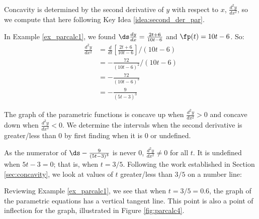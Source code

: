 {Concavity is determined by the second derivative of $y$ with respect to $x$, $\frac{d^2y}{dx^2}$, so we compute that here following Key Idea \ref{idea:second_der_par}.

In Example \ref{ex_parcalc1}, we found $\ds\frac{dy}{dx} = \frac{2t+6}{10t-6}$ and $\fp(t) = 10t-6$. So:
\begin{align*}
\frac{d^2y}{dx^2} &= \frac{d}{dt}\left[\frac{2t+6}{10t-6}\right]\Bigg/(10t-6) \\
				&= -\frac{72}{(10t-6)^2}\Bigg/(10t-6)\\
				&= -\frac{72}{(10t-6)^3} \\&= -\frac{9}{(5t-3)^3}
\end{align*}

The graph of the parametric functions is concave up when $\frac{d^2y}{dx^2} > 0$ and concave down when $\frac{d^2y}{dx^2} <0$. We determine the intervals when the second derivative is greater/less than 0 by first finding when it is 0 or undefined.

As the numerator of $\ds -\frac{9}{(5t-3)^3}$ is never 0, $\frac{d^2y}{dx^2} \neq 0$ for all $t$. It is undefined when $5t-3=0$; that is, when $t= 3/5$. Following the work established in Section \ref{sec:concavity}, we look at values of $t$ greater/less than $3/5$ on a number line:

\begin{center}\end{center}

Reviewing Example \ref{ex_parcalc1}, we see that when $t=3/5=0.6$, the graph of the parametric equations has a vertical tangent line. This point is also a point of inflection for the graph, illustrated in Figure \ref{fig:parcalc4}.
}\\

